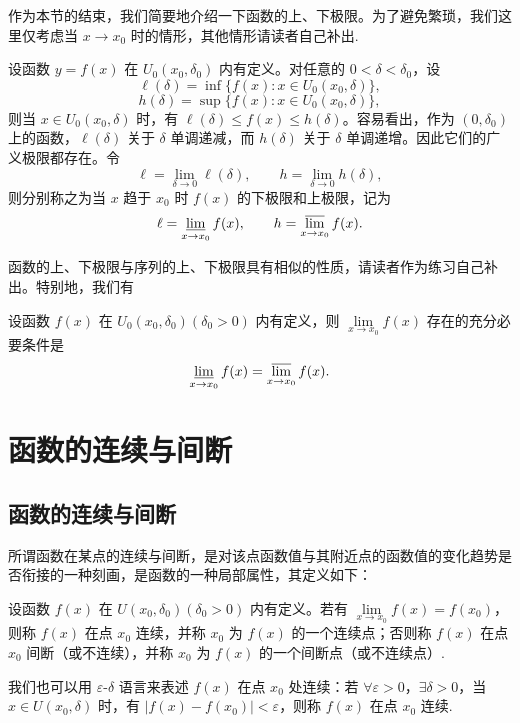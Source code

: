 作为本节的结束，我们简要地介绍一下函数的上、下极限。为了避免繁琐，我们这里仅考虑当 $x\to x_0$ 时的情形，其他情形请读者自己补出.

设函数 $y=f(x)$ 在 $U_0(x_0,\delta_0)$ 内有定义。对任意的 $0<\delta<\delta_0$，设
\[
  \ell(\delta)=\inf\{f(x):x\in U_0(x_0,\delta)\},
\]
\[
  h(\delta)=\sup\{f(x):x\in U_0(x_0,\delta)\},
\]
则当 $x\in U_0(x_0,\delta)$ 时，有 $\ell(\delta)\leqslant f(x)\leqslant h(\delta)$。容易看出，作为 $(0,\delta_0)$ 上的函数，$\ell(\delta)$ 关于 $\delta$ 单调递减，而 $h(\delta)$ 关于 $\delta$ 单调递增。因此它们的广义极限都存在。令
\[
  \ell=\lim_{\delta\to0}\ell(\delta),\qquad h=\lim_{\delta\to0}h(\delta),
\]
则分别称之为当 $x$ 趋于 $x_0$ 时 $f(x)$ 的下极限和上极限，记为
\[
  \ell=\varliminf_{x\to x_0}f(x),\qquad h=\varlimsup_{x\to x_0}f(x).
\]

函数的上、下极限与序列的上、下极限具有相似的性质，请读者作为练习自己补出。特别地，我们有

\begin{theorem}\label{theorem:ma-3-1-10}
设函数 $f(x)$ 在 $U_0(x_0,\delta_0)(\delta_0>0)$ 内有定义，则 $\lim\limits_{x\to x_0}f(x)$ 存在的充分必要条件是
\[
  \varliminf_{x\to x_0}f(x)=\varlimsup_{x\to x_0}f(x).
\]
\end{theorem}


\section{函数的连续与间断}
\label{sec:ma-3-2}

\subsection{函数的连续与间断}
\label{subsec:ma-3-2-1}

所谓函数在某点的连续与间断，是对该点函数值与其附近点的函数值的变化趋势是否衔接的一种刻画，是函数的一种局部属性，其定义如下：

\begin{definition}\label{definition:ma-3-2-1}
设函数 $f(x)$ 在 $U(x_0,\delta_0)(\delta_0>0)$ 内有定义。若有 $\lim\limits_{x\to x_0}f(x)=f(x_0)$，则称 $f(x)$ 在点 $x_0$ 连续，并称 $x_0$ 为 $f(x)$ 的一个连续点；否则称 $f(x)$ 在点 $x_0$ 间断（或不连续），并称 $x_0$ 为 $f(x)$ 的一个间断点（或不连续点）.
\end{definition}

我们也可以用 $\varepsilon$-$\delta$ 语言来表述 $f(x)$ 在点 $x_0$ 处连续：若 $\forall\varepsilon>0$，$\exists\delta>0$，当 $x\in U(x_0,\delta)$ 时，有 $|f(x)-f(x_0)|<\varepsilon$，则称 $f(x)$ 在点 $x_0$ 连续.

